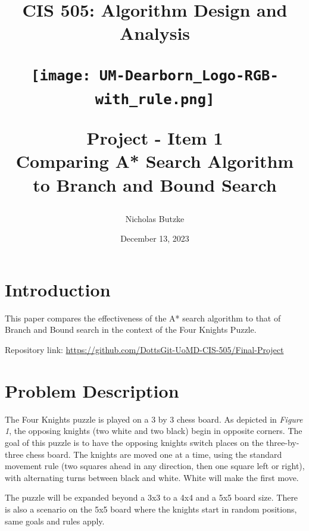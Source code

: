 \documentclass[12pt, letterpaper, final, onecolumn, titlepage] {article}
\title{CIS 505: Algorithm Design and Analysis \\
	\vspace{1.5cm}
   		\begin{center}\texttt{[image: UM-Dearborn\_Logo-RGB-with\_rule.png]} \end{center}
	\vspace{1.5cm}
	\textbf{Project - Item 1} \\
Comparing A* Search Algorithm to Branch and Bound Search}
\author{Nicholas Butzke}
\date{December 13, 2023}
\begin{document}
\maketitle

\doublespacing

\section{Introduction}

This paper compares the effectiveness of the A* search algorithm to that of Branch and Bound search in the context of the Four Knights Puzzle.

\noindent Repository link: \url{https://github.com/DottsGit-UoMD-CIS-505/Final-Project}

\section{Problem Description}

\begin{minipage}{\linewidth} %
\end{minipage}

\vspace{0.5cm}
\noindent The Four Knights puzzle is played on a 3 by 3 chess board. As depicted in \textit{Figure 1}, the opposing knights (two white and two black) begin in opposite corners. The goal of this puzzle is to have the opposing knights switch places on the three-by-three chess board. The knights are moved one at a time, using the standard movement rule (two squares ahead in any direction, then one square left or right), with alternating turns between black and white.  White will make the first move.

\noindent The puzzle will be expanded beyond a 3x3 to a 4x4 and a 5x5 board size.  There is also a scenario on the 5x5 board where the knights start in random positions, same goals and rules apply.
\newpage
\end{document}
